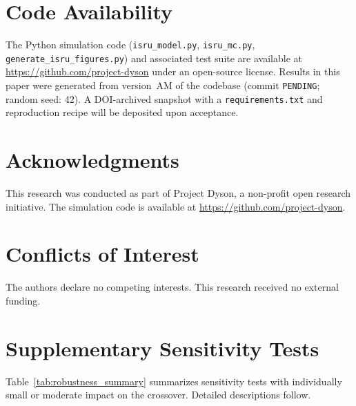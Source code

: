 \documentclass[5p,twocolumn]{elsarticle}
\begin{document}
\section*{Code Availability}

The Python simulation code (\texttt{isru\_model.py}, \texttt{isru\_mc.py}, \texttt{generate\_isru\_figures.py}) and associated test suite are available at \url{https://github.com/project-dyson} under an open-source license. Results in this paper were generated from version~AM of the codebase (commit \texttt{PENDING}; random seed: 42). A DOI-archived snapshot with a \texttt{requirements.txt} and reproduction recipe will be deposited upon acceptance.


\section*{Acknowledgments}

This research was conducted as part of Project Dyson, a non-profit open research initiative. The simulation code is available at \url{https://github.com/project-dyson}.

\section*{Conflicts of Interest}

The authors declare no competing interests. This research received no external funding.

\appendix
\section{Supplementary Sensitivity Tests}
\label{sec:appendix_sensitivity}

Table~\ref{tab:robustness_summary} summarizes sensitivity tests with individually small or moderate impact on the crossover. Detailed descriptions follow.
\end{document}

